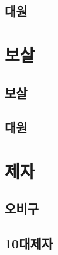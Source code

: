 \documentclass[12pt, a4paper, oneside]{book}
\let\stdsection\section
\renewcommand\section{\newpage\stdsection}
\begin{document}
	\section{ 대원 }


	\chapter{ 보살 }
	\noptcrule

	\newpage	
	\minitoc



%
	\section{ 보살 }


%
	\section{ 대원 }




	\chapter{ 제자 }
	\noptcrule

	\newpage	
	\minitoc



%
	\section{ 오비구 }


%
	\section{ 10대제자 }
\end{document}
